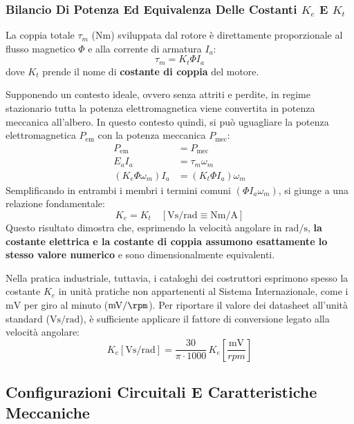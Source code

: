 ﻿\documentclass[11pt, a4paper]{article}
\begin{document}
\subsubsection{Bilancio Di Potenza Ed Equivalenza Delle Costanti \texorpdfstring{$K_e$}{Ke} E \texorpdfstring{$K_t$}{Kt}}
La coppia totale $\tau_m$ ($\si{\newton\meter}$) sviluppata dal rotore è direttamente proporzionale al flusso magnetico $\Phi$ e alla corrente di armatura $I_a$:
\[
    \tau_m = K_t \Phi I_a
\]
dove $K_t$ prende il nome di \textbf{costante di coppia} del motore.

Supponendo un contesto ideale, ovvero senza attriti e perdite, in regime stazionario tutta la potenza elettromagnetica viene convertita in potenza meccanica all'albero. In questo contesto quindi, si può uguagliare la potenza elettromagnetica $P_{\text{em}}$ con la potenza meccanica $P_{\text{mec}}$:
\begin{align*}
    P_{\text{em}} &= P_{\text{mec}}\\
    E_{a} I_{a} &= \tau_{m} \omega_{m}\\
    (K_e \Phi \omega_m) I_a &= (K_t \Phi I_a) \omega_m
\end{align*}
Semplificando in entrambi i membri i termini comuni $(\Phi I_a \omega_m)$, si giunge a una relazione fondamentale:
\[
    \boxed{K_e = K_t} \quad \left[\si{\volt\second\per\radian} \equiv \si{\newton\meter\per\ampere}\right]
\]
Questo risultato dimostra che, esprimendo la velocità angolare in $\si{\radian\per\second}$, \textbf{la costante elettrica e la costante di coppia assumono esattamente lo stesso valore numerico} e sono dimensionalmente equivalenti.

Nella pratica industriale, tuttavia, i cataloghi dei costruttori esprimono spesso la costante $K_e$ in unità pratiche non appartenenti al Sistema Internazionale, come i $\si{\milli\volt}$ per giro al minuto ($\si{\milli\volt\per\rpm}$). Per riportare il valore dei datasheet all'unità standard ($\si{\volt\second\per\radian}$), è sufficiente applicare il fattore di conversione legato alla velocità angolare:
\[
    K_e \left[\si{\volt\second\per\radian}\right] = \frac{30}{\pi \cdot 1000} \, K_e \left[\frac{\si{\milli\volt}}{\si{rpm}}\right]
\]
\newpage

\subsection{Configurazioni Circuitali E Caratteristiche Meccaniche}
\end{document}
